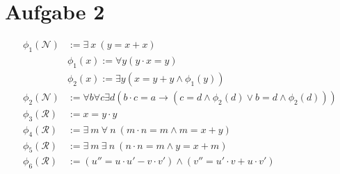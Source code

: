 \documentclass[a4paper,10pt]{article}
\begin{document}
\section*{Aufgabe 2}
\begin{align*}
\phi_1(\mathcal{N}) &:= \exists~ x~ (y = x + x) \\
 &\phi_1(x) := \forall y(y \cdot x = y) \\
 &\phi_2(x) := \exists y(x = y +y \land \phi_1(y)) \\
\phi_2(\mathcal{N}) &:= \forall b \forall c \exists d (b \cdot c = a \rightarrow (c = d\land \phi_2(d) \lor b = d\land \phi_2(d) )) \\
\phi_3(\mathcal{R}) &:= x = y \cdot y \\
\phi_4(\mathcal{R}) &:= \exists~ m~ \forall~ n~ (m \cdot n = m \wedge m = x + y) \\
\phi_5(\mathcal{R}) &:= \exists~ m~ \exists~ n~ (n \cdot n = m \wedge y = x + m) \\
\phi_6(\mathcal{R}) &:= (u'' = u \cdot u' - v \cdot v') \wedge (v'' = u' \cdot v + u \cdot v') \\
\end{align*}
\end{document}

